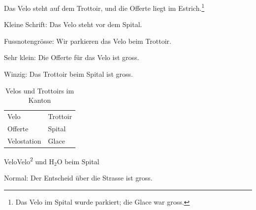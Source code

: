 \documentclass[11pt]{article}
\begin{document}
Das Velo steht auf dem Trottoir, und die Offerte liegt im Estrich.\footnote{Das Velo im Spital wurde parkiert; die Glace war gross.}

{\small Kleine Schrift: Das Velo steht vor dem Spital.}

{\footnotesize Fussnotengrösse: Wir parkieren das Velo beim Trottoir.}

{\scriptsize Sehr klein: Die Offerte für das Velo ist gross.}

{\tiny Winzig: Das Trottoir beim Spital ist gross.}

\begin{table}[h]\centering
\begin{tabular}{ll}
Velo & Trottoir \\
Offerte & Spital \\
{\scriptsize Velostation} & {\tiny Glace} \\
\end{tabular}
\caption{Velos und Trottoirs im Kanton}
\end{table}

\begin{center}{\scriptsize Velo}\quad Velo\textsuperscript{2} und H$_{2}$O beim Spital\end{center}

Normal: Der Entscheid über die Strasse ist gross.
\end{document}

